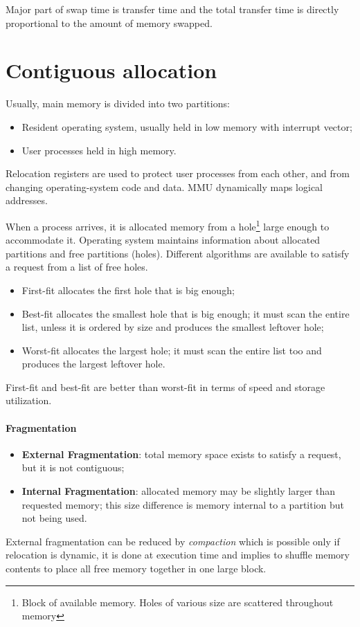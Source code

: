 Major part of swap time is transfer time and the total transfer time is directly proportional to the amount of memory swapped.

\section{Contiguous allocation}
Usually, main memory is divided into two partitions:
\begin{itemize}
\item Resident operating system, usually held in low memory with interrupt vector;
\item User processes held in high memory.
\end{itemize}
Relocation registers are used to protect user processes from each other, and from changing operating-system code and data. MMU dynamically maps logical addresses.

When a process arrives, it is allocated memory from a hole\footnote{Block of available memory. Holes of various size are scattered throughout memory} large enough to accommodate it. Operating system maintains information about allocated partitions and free partitions (holes). Different algorithms are available to satisfy a request from a list of free holes.
\begin{itemize}
\item First-fit allocates the first hole that is big enough;
\item Best-fit allocates the smallest hole that is big enough; it must scan the entire list, unless it is ordered by size and produces the smallest leftover hole;
\item Worst-fit allocates the largest hole; it must scan the entire list too and produces the largest leftover hole.
\end{itemize}
First-fit and best-fit are better than worst-fit in terms of speed and storage utilization.

\paragraph{Fragmentation}
\begin{itemize}
\item \textbf{External Fragmentation}: total memory space exists to satisfy a request, but it is not contiguous;
\item \textbf{Internal Fragmentation}: allocated memory may be slightly larger than requested memory; this size difference is memory internal to a partition but not being used.
\end{itemize}
External fragmentation can be reduced by \emph{compaction} which is possible only if relocation is dynamic, it is done at execution time and implies to shuffle memory contents to place all free memory together in one large block.

